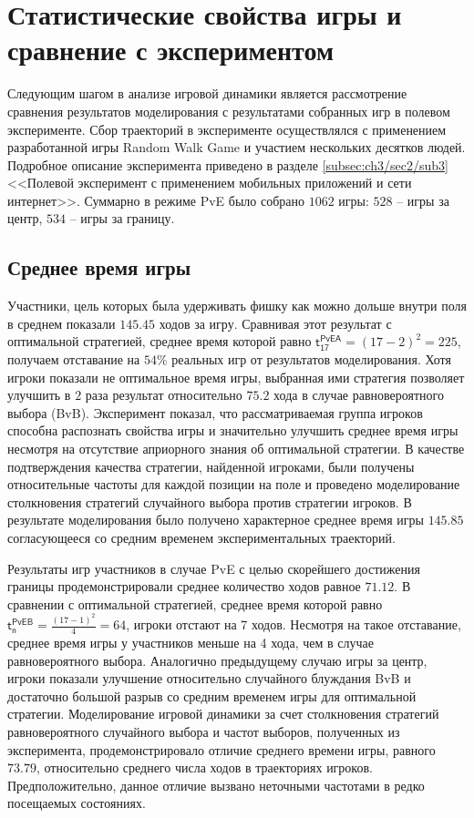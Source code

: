 \section{Статистические свойства игры и сравнение с экспериментом}\label{sec:ch3/sec4}

Следующим шагом в анализе игровой динамики является рассмотрение сравнения результатов моделирования с результатами собранных игр в полевом эксперименте. Сбор траекторий в эксперименте осуществлялся с применением разработанной игры Random Walk Game и участием нескольких десятков людей. Подробное описание эксперимента приведено в разделе \cref{subsec:ch3/sec2/sub3} <<Полевой эксперимент с применением мобильных приложений и сети интернет>>. Суммарно в режиме PvE было собрано $1062$ игры: $528$ -- игры за центр, $534$ -- игры за границу. 

\subsection{Среднее время игры}\label{subsec:ch3/sec4/sub1}

Участники, цель которых была удерживать фишку как можно дольше внутри поля в среднем показали $145.45$ ходов за игру. Сравнивая этот результат с оптимальной стратегией, среднее время которой равно $\boldsymbol{\mathsf{t_{17}^{PvE A}}} = (17-2)^2 = 225$, получаем отставание на $54\%$ реальных игр от результатов моделирования. Хотя игроки показали не оптимальное время игры, выбранная ими стратегия позволяет улучшить в $2$ раза результат относительно $75.2$ хода в случае равновероятного выбора (BvB). Эксперимент показал, что рассматриваемая группа игроков способна распознать свойства игры и значительно улучшить среднее время игры несмотря на отсутствие априорного знания об оптимальной стратегии. В качестве подтверждения качества стратегии, найденной игроками, были получены относительные частоты для каждой позиции на поле и проведено моделирование столкновения стратегий случайного выбора против стратегии игроков. В результате моделирования было получено характерное среднее время игры $145.85$ согласующееся со средним временем экспериментальных траекторий.

Результаты игр участников в случае PvE с целью скорейшего достижения границы продемонстрировали среднее количество ходов равное $71.12$. В сравнении с оптимальной стратегией, среднее время которой равно $\boldsymbol{\mathsf{t_n^{PvE B}}} = \frac{(17-1)^2}{4} = 64$, игроки отстают на 7 ходов. Несмотря на такое отставание, среднее время игры у участников меньше на 4 хода, чем в случае равновероятного выбора. Аналогично предыдущему случаю игры за центр, игроки показали улучшение относительно случайного блуждания BvB и достаточно большой разрыв со средним временем игры для оптимальной стратегии. Моделирование игровой динамики за счет столкновения стратегий равновероятного случайного выбора и частот выборов, полученных из эксперимента, продемонстрировало отличие среднего времени игры, равного $73.79$, относительно среднего числа ходов в траекториях игроков. Предположительно, данное отличие вызвано неточными частотами в редко посещаемых состояниях. 

